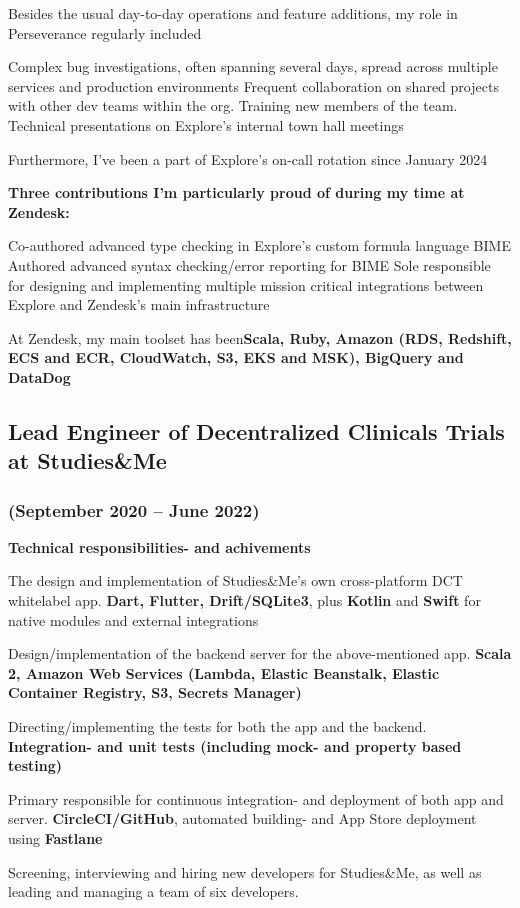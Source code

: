\documentclass[10pt, a4paper]{article}
\newcommand{\sme}{Studies\&Me}
\begin{document}
Besides the usual day-to-day operations and feature additions, my role in Perseverance regularly included 
\begin{outline}
 \1 Complex bug investigations, often spanning several days, spread across multiple services and production environments
 \1 Frequent collaboration on shared projects with other dev teams within the org.
 \1 Training new members of the team.
 \1 Technical presentations on Explore's internal town hall meetings
\end{outline}
Furthermore, I've been a part of Explore's on-call rotation since January 2024

\textbf{Three contributions I'm particularly proud of during my time at Zendesk:}
\begin{outline}
\1 Co-authored  advanced type checking in Explore's custom formula language BIME
\1 Authored advanced syntax checking/error reporting for BIME
\1 Sole responsible for designing and implementing multiple mission critical integrations between Explore and Zendesk's main infrastructure
\end{outline}
    {\footnotesize At Zendesk, my main toolset has been\newline \textbf{Scala, Ruby, Amazon (RDS, Redshift, ECS and ECR, CloudWatch, S3, EKS and MSK), BigQuery and DataDog}}

\subsection*{Lead Engineer of Decentralized Clinicals Trials at \sme}
\subsubsection*{{\normalfont(September 2020 -- June 2022)}}
\textbf{Technical responsibilities- and achivements}
\begin{outline}
  \1 The design and implementation of \sme's own cross-platform DCT whitelabel app.\newline
    {\footnotesize \textbf{Dart, Flutter, Drift/SQLite3}, plus \textbf{Kotlin} and \textbf{Swift} for native modules and external integrations}

  \1 Design/implementation of the backend server for the above-mentioned app.\newline
  {\footnotesize \textbf{Scala 2, Amazon Web Services (Lambda, Elastic Beanstalk, Elastic Container Registry, S3, Secrets Manager)}}

  \1 Directing/implementing the tests for both the app and the backend.\newline
    {\footnotesize \textbf{Integration- and unit tests (including mock- and property based testing)}}

  \1 Primary responsible for continuous integration- and deployment of both app and server.\newline
    {\footnotesize \textbf{CircleCI/GitHub}, automated building- and App Store deployment using \textbf{Fastlane}}

  \1 Screening, interviewing and hiring new developers for \sme, as well as leading and managing a team of six developers.
\end{outline}
\end{document}
